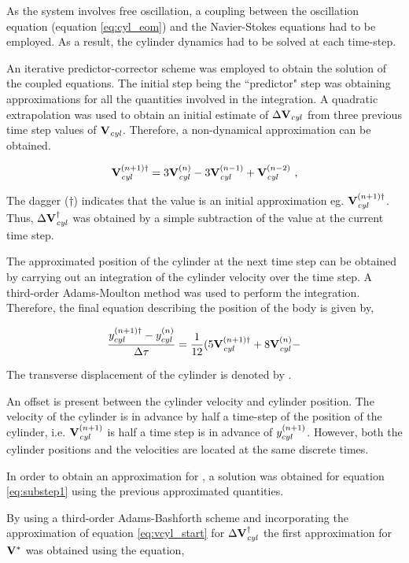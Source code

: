 As the system involves free oscillation, a coupling between the oscillation equation (equation \ref{eq:cyl_eom}) and the Navier-Stokes equations had to be employed. As a result, the cylinder dynamics had to be solved at each time-step.

An iterative predictor-corrector scheme was employed to obtain the solution of the coupled equations. The initial step being the ``predictor" step was obtaining approximations for all the quantities involved in  the integration. A quadratic extrapolation was used to obtain an initial estimate of $\Delta\mathbf{V}_{\mathit{cyl}}$ from  three previous time step values of $\mathbf{V}_{\mathit{cyl}}$. Therefore, a non-dynamical approximation can be obtained.  
 
 
\begin{equation} \centering
\label{eq:vcyl_start}
\Vcyl^{(n+1)\dag} = 3\Vcyl^{(n)} - 3\Vcyl^{(n-1)} + \Vcyl^{(n-2)} ~,
\end{equation}


The dagger ($\dag$) indicates that the value is an initial approximation eg. $\mathbf{V}_{\mathit{cyl}}^{(n+1)\dag}$. Thus, $\Delta\mathbf{V}_{\mathit{cyl}}^{\dag}$ was obtained by a simple subtraction of the value at the current time step. 

The approximated position of the cylinder at the next time step can be obtained by carrying out an integration of the cylinder velocity over the time step. A third-order Adams-Moulton method was used to perform the integration. Therefore, the final equation describing the position of the body is given by, 

\begin{equation} \centering
	\label{eq:ycyl_start}
	\frac{\ycyl^{(n+1)\dag} - \ycyl^{(n)}}{\Delta\tau} = \frac{1}{12}(5\Vcyl^{(n+1)\dag} + 8\Vcyl^{(n)} -  
\end{equation}

The transverse displacement of the cylinder is denoted by \ycyl.

An offset is present between the cylinder velocity and cylinder position. The velocity of the cylinder is in advance by half a time-step of the position of the cylinder, i.e. $\mathbf{V}_{\mathit{cyl}}^{(n+1)}$ is half a time step is in advance of $y_{cyl}^{(n+1)}$. However, both the cylinder positions and the velocities are located at the same discrete times.

In order to obtain an approximation for \Vint, a solution was obtained for equation \ref{eq:substep1} using the previous approximated quantities.

By using a third-order Adams-Bashforth scheme and incorporating the approximation of equation \ref{eq:vcyl_start} for  $\Delta\mathbf{V}_{\mathit{cyl}}^{\dag}$ the first approximation for $\mathbf{V}^{*}$ was obtained using the equation,
 
